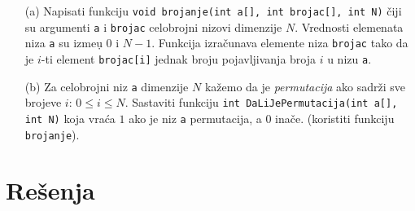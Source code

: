 \begin{Exercise}[label=p2.1_] 
\begin{itemize}
\item [(a)]
Napisati funkciju \verb"void brojanje(int a[], int brojac[], int N)"
\v ciji su argumenti \verb"a" i \verb"brojac" celobrojni nizovi dimenzije $N$.
Vrednosti elemenata niza \verb"a" su izme\d u $0$ i $N-1$. Funkcija izra\v cunava
elemente niza \verb"brojac" tako da je $i$-ti element \verb"brojac[i]" jednak
broju pojavljivanja broja $i$ u nizu \verb"a".

\item[(b)]
Za celobrojni niz \verb"a" dimenzije $N$ 
ka\v zemo da je \emph{permutacija} ako sadr\v zi sve brojeve
$i$: $0 \leq i \le N$.
Sastaviti funkciju \verb"int DaLiJePermutacija(int a[], int N)" koja vra\' ca
$1$ ako je niz \verb"a" permutacija, a $0$ ina\v ce. (koristiti funkciju
\verb"brojanje").
\end{itemize}
\end{Exercise}
\begin{Answer}[ref=p2.1_]
\end{Answer}


\section{Rešenja}
\shipoutAnswer
